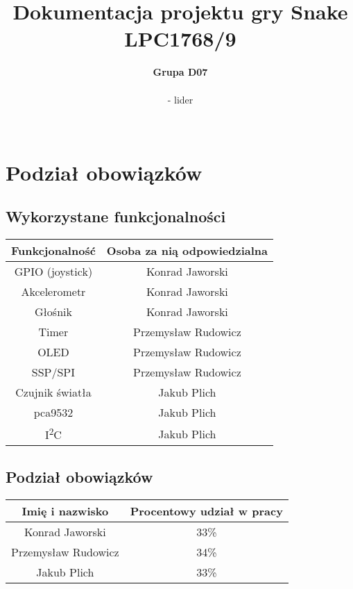\documentclass{classrep}
\author{%
	\textbf{Grupa D07}\\\\
	\studentinfo[216879@edu.p.lodz.pl]{Przemysław Rudowicz}{216879} - lider\\
	\studentinfo[216782@edu.p.lodz.pl]{Konrad Jaworski}{216782}\\
	\studentinfo[216866@edu.p.lodz.pl]{Jakub Plich}{216866}%
}
\title{Dokumentacja projektu gry Snake\\
		LPC1768/9}
\begin{document}
	\thispagestyle{fancyplain}
	\maketitle
	

	
	\newpage
	\tableofcontents
	\newpage
	
	\section{Podział obowiązków}
	{
	\subsection{Wykorzystane funkcjonalności}
		\begin{center}
			\begin{tabular}{|c|c|}
				\hline 
				\textbf{Funkcjonalność} & \textbf{Osoba za nią odpowiedzialna} \\ 
				\hline 
				GPIO (joystick) & Konrad Jaworski \\ 
				\hline 
				Akcelerometr & Konrad Jaworski \\ 
				\hline 
				Głośnik & Konrad Jaworski \\ 
				\hline 
				Timer & Przemysław Rudowicz \\ 
				\hline 
				OLED & Przemysław Rudowicz \\ 
				\hline 
				SSP/SPI & Przemysław Rudowicz \\ 
				\hline 
				Czujnik światła & Jakub Plich \\ 
				\hline 
				pca9532 & Jakub Plich \\ 
				\hline 
				I\textsuperscript{2}C & Jakub Plich \\ 
				\hline 
			\end{tabular} 	
		\end{center}
	}

	\subsection{Podział obowiązków}
\begin{center}
			\begin{tabular}{|c|c|}
			\hline 
			\textbf{Imię i nazwisko} & \textbf{Procentowy udział w pracy} \\ 
			\hline 
			Konrad Jaworski & 33\% \\ 
			\hline 
			Przemysław Rudowicz & 34\% \\ 
			\hline 
			Jakub Plich & 33\% \\ 
			\hline 
		\end{tabular} 
\end{center}
\newpage
\end{document}
